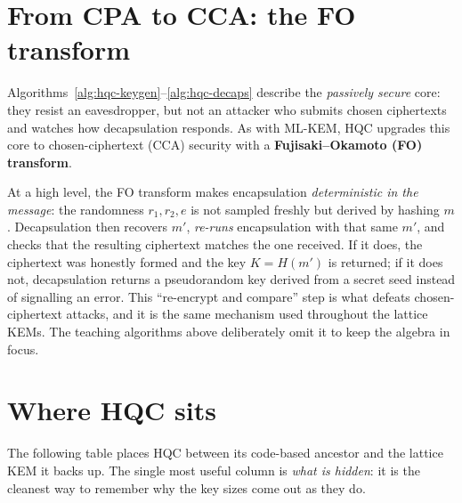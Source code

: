 \section{From CPA to CCA: the FO transform}

Algorithms~\ref{alg:hqc-keygen}--\ref{alg:hqc-decaps} describe the \emph{passively secure} core: they resist an eavesdropper, but not an attacker who submits chosen ciphertexts and watches how decapsulation responds. As with ML-KEM, HQC upgrades this core to chosen-ciphertext (CCA) security with a \textbf{Fujisaki--Okamoto (FO) transform}.

At a high level, the FO transform makes encapsulation \emph{deterministic in the message}: the randomness $r_1, r_2, e$ is not sampled freshly but derived by hashing $m$. Decapsulation then recovers $m'$, \emph{re-runs} encapsulation with that same $m'$, and checks that the resulting ciphertext matches the one received. If it does, the ciphertext was honestly formed and the key $K = H(m')$ is returned; if it does not, decapsulation returns a pseudorandom key derived from a secret seed instead of signalling an error. This ``re-encrypt and compare'' step is what defeats chosen-ciphertext attacks, and it is the same mechanism used throughout the lattice KEMs. The teaching algorithms above deliberately omit it to keep the algebra in focus.

\section{Where HQC sits}

The following table places HQC between its code-based ancestor and the lattice KEM it backs up. The single most useful column is \emph{what is hidden}: it is the cleanest way to remember why the key sizes come out as they do.

